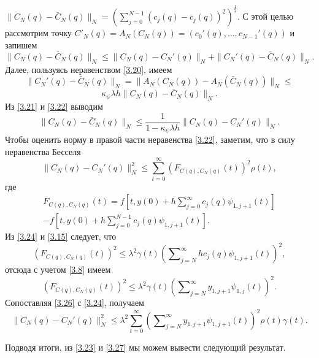 $\|C_N(q)-\bar C_N(q)\|_N= \left(\sum_{j=0}^{N-1}(c_j(q)-\bar c_j(q))^2\right)^\frac12$. С этой целью рассмотрим точку $C'_N(q)=A_N(C_N(q))=(c_0'(q),\ldots,c_{N-1}'(q))$ и запишем
\begin{equation}\label{3.21}
\|C_N(q)-\bar C_N(q)\|_N\le \|C_N(q)- C_N'(q)\|_N+\|C_N'(q)-\bar C_N(q)\|_N.
\end{equation}
Далее, пользуясь неравенством \eqref{3.20}, имеем
$$
\|C_N'(q)-\bar C_N(q)\|_N=\|A_N(C_N(q))-A_N(\bar C_N(q))\|_N\le
$$
\begin{equation}\label{3.22}
\kappa_\psi\lambda h\|C_N(q)-\bar C_N(q)\|_N.
\end{equation}
Из \eqref{3.21} и \eqref{3.22} выводим
\begin{equation}\label{3.23}
\|C_N(q)-\bar C_N(q)\|_N\le \frac1{1-\kappa_\psi\lambda h}\|C_N(q)- C_N'(q)\|_N.
\end{equation}
Чтобы оценить норму в правой части неравенства \eqref{3.22}, заметим, что в силу неравенства Бесселя
\begin{equation}\label{3.24}
\|C_N(q)- C_N'(q)\|_N^2\le \sum_{t=0}^{\infty} (F_{C(q),C_N(q)}(t))^2\rho(t),
\end{equation}
где
\begin{multline}\label{3.25}
 F_{C(q),C_N(q)}(t)=f\left[t,y(0)+ h\sum\nolimits_{j=0}^\infty c_j(q)\psi_{1,j+1}(t)\right] \\
  -f\left[t,y(0)+ h\sum\nolimits_{j=0}^{N-1}c_j(q)\psi_{1,j+1}(t)\right].
\end{multline}
Из \eqref{3.24} и \eqref{3.15} следует, что
$$
(F_{C(q),C_N(q)}(t))^2\le \lambda^2 \gamma(t)\left(\sum\nolimits_{j=N}^\infty hc_j(q)\psi_{1,j+1}(t)\right)^2,
$$
отсюда с учетом \eqref{3.8} имеем
\begin{equation}\label{3.26}
(F_{C(q),C_N(q)}(t))^2\le \lambda^2 \gamma(t)  \left(\sum\nolimits_{j=N}^\infty  y_{1,j+1}\psi_{1,j}(t)\right)^2.
\end{equation}
Сопоставляя \eqref{3.26} с \eqref{3.24}, получаем
\begin{equation}\label{3.27}
\|C_N(q)- C_N'(q)\|_N^2\le \lambda^2\sum_{t=0}^\infty\left(\sum\nolimits_{j=N}^\infty y_{1,j+1} \psi_{1,j+1}(t)\right)^2\rho(t)\gamma(t).
\end{equation}

Подводя итоги, из \eqref{3.23} и \eqref{3.27}  мы можем вывести следующий результат.

